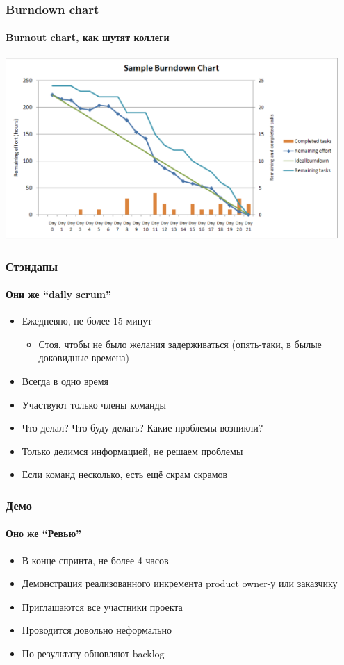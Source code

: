 \documentclass[xetex,mathserif,serif]{beamer}
\begin{document}
    \begin{frame}
        \frametitle{Burndown chart}
        \framesubtitle{Burnout chart, как шутят коллеги}
        \begin{center}
            \includegraphics[width=0.95\textwidth]{burndown.png}
        \end{center}
    \end{frame}

    \begin{frame}
        \frametitle{Стэндапы}
        \framesubtitle{Они же ``daily scrum''}
        \begin{itemize}
            \item Ежедневно, не более 15 минут
            \begin{itemize}
                \item Стоя, чтобы не было желания задерживаться (опять-таки, в былые доковидные времена)
            \end{itemize}
            \item Всегда в одно время
            \item Участвуют только члены команды
            \item Что делал? Что буду делать? Какие проблемы возникли?
            \item Только делимся информацией, не решаем проблемы
            \item Если команд несколько, есть ещё скрам скрамов
        \end{itemize}
    \end{frame}

    \begin{frame}
        \frametitle{Демо}
        \framesubtitle{Оно же ``Ревью''}
        \begin{itemize}
            \item В конце спринта, не более 4 часов
            \item Демонстрация реализованного инкремента product owner-у или заказчику
            \item Приглашаются все участники проекта
            \item Проводится довольно неформально
            \item По результату обновляют backlog
        \end{itemize}
    \end{frame}
\end{document}
